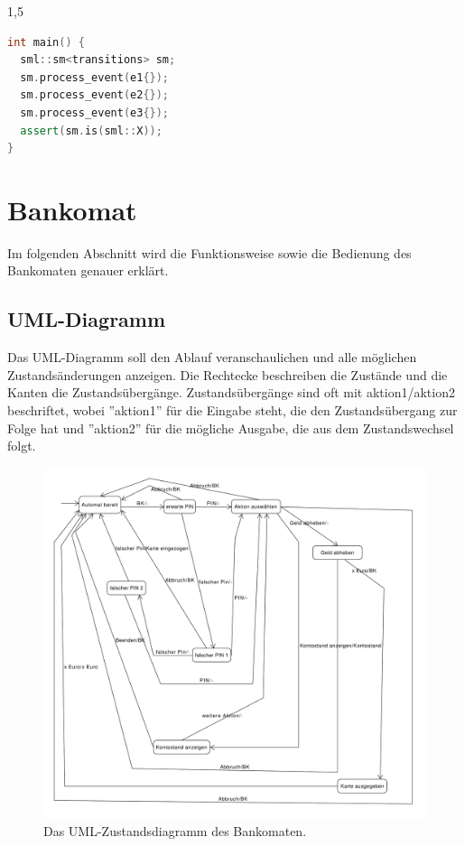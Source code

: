 \documentclass[a4paper]{article}
\begin{document}
\begin{spacing}{1,5}
\begin{lstlisting}[language=c++]
int main() {
  sml::sm<transitions> sm;
  sm.process_event(e1{});
  sm.process_event(e2{});
  sm.process_event(e3{});
  assert(sm.is(sml::X));
}
\end{lstlisting}

\newpage

\section{Bankomat}

Im folgenden Abschnitt wird die Funktionsweise sowie die Bedienung des Bankomaten genauer erklärt. 

\subsection{UML-Diagramm}

Das UML-Diagramm soll den Ablauf veranschaulichen und alle möglichen Zustandsänderungen anzeigen. Die Rechtecke beschreiben die Zustände und die Kanten die Zustandsübergänge. Zustandsübergänge sind oft mit aktion1/aktion2 beschriftet, wobei ''aktion1'' für die Eingabe steht, die den Zustandsübergang zur Folge hat und ''aktion2'' für die mögliche Ausgabe, die aus dem Zustandswechsel folgt.


\begin{figure}[h!]
\begin{center}
\includegraphics[width=\linewidth]{bankomat_v2.pdf}
\caption{Das UML-Zustandsdiagramm des Bankomaten.}
\end{center}
\end{figure}
	

\end{spacing}
\end{document}
